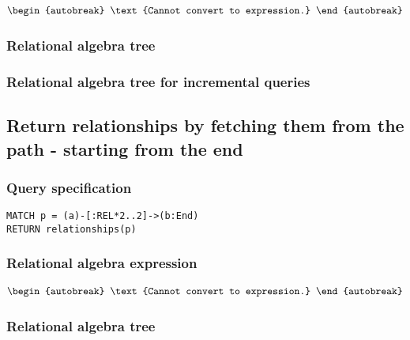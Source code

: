 \begin{align*}
\begin{autobreak}
\text{Cannot convert to expression.}
\end{autobreak}
\end{align*}

\subsubsection*{Relational algebra tree}


\subsubsection*{Relational algebra tree for incremental queries}


\subsection{Return relationships by fetching them from the path - starting from the end}

\subsubsection*{Query specification}

\begin{lstlisting}
MATCH p = (a)-[:REL*2..2]->(b:End)
RETURN relationships(p)
\end{lstlisting}

\subsubsection*{Relational algebra expression}

\begin{align*}
\begin{autobreak}
\text{Cannot convert to expression.}
\end{autobreak}
\end{align*}

\subsubsection*{Relational algebra tree}


